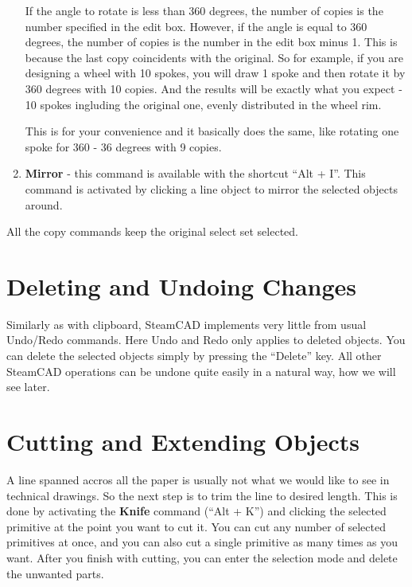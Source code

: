 \begin{enumerate}
If the angle to rotate is less than 360 degrees, the number of copies is the number
specified in the edit box. However, if the angle is equal to 360 degrees, the number
of copies is the number in the edit box minus 1. This is because the last copy
coincidents with the original. So for example, if you are designing a wheel with
10 spokes, you will draw 1 spoke and then rotate it by 360 degrees with 10 copies.
And the results will be exactly what you expect - 10 spokes ingluding the original one,
evenly distributed in the wheel rim.

This is for your convenience and it basically does the same, like rotating one spoke
for 360 - 36 degrees with 9 copies.
\item \textbf{Mirror} - this command is available with the shortcut ``Alt + I''.
This command is activated by clicking a line object to mirror the selected objects
around.
\end{enumerate}

All the copy commands keep the original select set selected.

\section{Deleting and Undoing Changes}

Similarly as with clipboard, SteamCAD implements very little from usual Undo/Redo
commands. Here Undo and Redo only applies to deleted objects. You can delete the selected
objects simply by pressing the ``Delete'' key. All other SteamCAD operations can be
undone quite easily in a natural way, how we will see later.

\section{Cutting and Extending Objects}

A line spanned accros all the paper is usually not what we would like to see in technical
drawings. So the next step is to trim the line to desired length. This is done by
activating the \textbf{Knife} command (``Alt + K'') and clicking the selected primitive at the
point you want to cut it. You can cut any number of selected primitives at once,
and you can also cut a single primitive as many times as you want. After you finish
with cutting, you can enter the selection mode and delete the unwanted parts.

